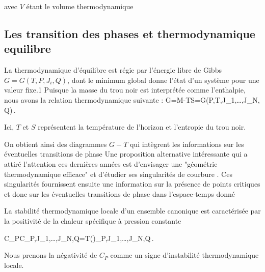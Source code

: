 avec $V$ étant le volume thermodynamique




\subsection{ Les transition des phases et thermodynamique equilibre }


La thermodynamique d'équilibre est régie par l'énergie libre de Gibbs $G=G(T,P,J_i, Q)$, dont le minimum global donne l'état d'un système pour une valeur fixe.1 Puisque la masse du trou noir est interprétée comme l'enthalpie, nous avons la relation thermodynamique suivante :
\be
G=M-TS=G(P,T,J_1,\dots,J_N, Q)\,. 
\ee

Ici, $T$ et $S$ représentent la température de l'horizon et l'entropie du trou noir.

On obtient ainsi des diagrammes $G-T$ qui intègrent les informations sur les éventuelles transitions de phase
Une proposition alternative intéressante qui a attiré l'attention ces dernières années est d'envisager une "géométrie thermodynamique efficace" et d'étudier ses singularités de courbure . Ces singularités fournissent ensuite une information sur la présence de points critiques et donc sur les éventuelles transitions de phase dans l'espace-temps donné

La stabilité thermodynamique locale d'un ensemble canonique est caractérisée par la positivité de la chaleur spécifique à pression constante


\be\label{CP}
C_P\equiv C_{P,J_1,\dots,J_N,Q}=T\left(\right)_{P,J_1,\dots,J_N,Q}\,.
\ee

Nous prenons la négativité de $C_P$ comme un signe d'instabilité thermodynamique locale.

